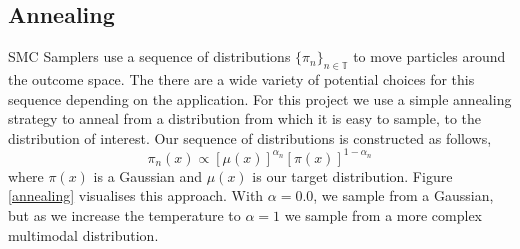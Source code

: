 \documentclass[12pt]{elsarticle}
\begin{document}
\subsection*{Annealing}
SMC Samplers use a sequence of distributions $\{\pi_n\}_{n\in \mathbb{T}}$ to move particles around the outcome space. The there are a wide variety of potential choices for this sequence depending on the application. For this project we use a simple annealing strategy to anneal from a distribution from which it is easy to sample, to the distribution of interest. Our sequence of distributions is constructed as follows,
\[
\pi_n(x) \propto [\mu(x)]^{\alpha_n}  [\pi(x)]^{1-\alpha_n}
\]
where $\pi(x)$ is a Gaussian and $\mu(x)$ is our target distribution. Figure \ref{annealing} visualises this approach. With $\alpha = 0.0$, we sample from a Gaussian, but as we increase the temperature to $\alpha = 1$ we sample from a more complex multimodal distribution.
\end{document}
